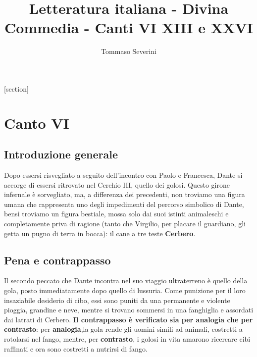 \documentclass[10pt,a4paper]{article}
\author{Tommaso Severini}
\title{Letteratura italiana - Divina Commedia - Canti VI XIII e XXVI}
\begin{document}
	\maketitle
	
	\tableofcontents
	
	[section]
	
	\section{Canto VI}
	
	\subsection{Introduzione generale}
	
	Dopo essersi risvegliato a seguito dell'incontro con Paolo e Francesca, Dante si accorge di essersi ritrovato nel Cerchio III, quello dei golosi. Questo girone infernale è sorvegliato, ma, a differenza dei precedenti, non troviamo una figura umana che rappresenta uno degli impedimenti del percorso simbolico di Dante, bensì troviamo un figura bestiale, mossa solo dai suoi istinti animaleschi e completamente priva di ragione (tanto che Virgilio, per placare il guardiano, gli getta un pugno di terra in bocca): il cane a tre teste \textbf{Cerbero}. 
	
	\subsection{Pena e contrappasso}
	
	Il secondo peccato che Dante incontra nel suo viaggio ultraterreno è quello della gola, posto immediatamente dopo quello di lussuria. Come punizione per il loro insaziabile desiderio di cibo, essi sono puniti da una permanente e violente pioggia, grandine e neve, mentre si trovano sommersi in una fanghiglia e assordati dai latrati di Cerbero. \textbf{Il contrappasso è verificato sia per analogia che per contrasto}: per \textbf{analogia},la gola rende gli uomini simili ad animali, costretti a rotolarsi nel fango, mentre, per \textbf{contrasto}, i golosi in vita amarono ricercare cibi raffinati e ora sono costretti a nutrirsi di fango.
	
\end{document}
